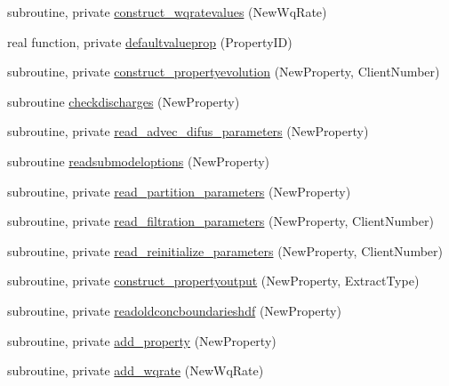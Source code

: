 \begin{DoxyCompactItemize}
\item 
subroutine, private \mbox{\hyperlink{namespacemodulewaterproperties_ad23f7574f0a024c14e1ef11aeadb52ab}{construct\+\_\+wqratevalues}} (New\+Wq\+Rate)
\item 
real function, private \mbox{\hyperlink{namespacemodulewaterproperties_a3a9b963326300338acf15af3b6edcdae}{defaultvalueprop}} (Property\+ID)
\item 
subroutine, private \mbox{\hyperlink{namespacemodulewaterproperties_ac9ab6b0f5ee3c2470edaceaf1ef669a7}{construct\+\_\+propertyevolution}} (New\+Property, Client\+Number)
\item 
subroutine \mbox{\hyperlink{namespacemodulewaterproperties_a3d45e3e4c8782ebce340659d7f000fbb}{checkdischarges}} (New\+Property)
\item 
subroutine, private \mbox{\hyperlink{namespacemodulewaterproperties_a178c0df0a5c46c1d129d7dfd6e6982fc}{read\+\_\+advec\+\_\+difus\+\_\+parameters}} (New\+Property)
\item 
subroutine \mbox{\hyperlink{namespacemodulewaterproperties_a5a214d6f2f108bf67d3db3df4165609d}{readsubmodeloptions}} (New\+Property)
\item 
subroutine, private \mbox{\hyperlink{namespacemodulewaterproperties_ac511e23eb2975f0a46fef2973712f060}{read\+\_\+partition\+\_\+parameters}} (New\+Property)
\item 
subroutine, private \mbox{\hyperlink{namespacemodulewaterproperties_ace6684fcd5340a736f01034eee0565cd}{read\+\_\+filtration\+\_\+parameters}} (New\+Property, Client\+Number)
\item 
subroutine, private \mbox{\hyperlink{namespacemodulewaterproperties_adb847af3f3968c2d9bf627677cb37d95}{read\+\_\+reinitialize\+\_\+parameters}} (New\+Property, Client\+Number)
\item 
subroutine, private \mbox{\hyperlink{namespacemodulewaterproperties_a37e8798b8bd2e4c33eff80dd151d0d31}{construct\+\_\+propertyoutput}} (New\+Property, Extract\+Type)
\item 
subroutine, private \mbox{\hyperlink{namespacemodulewaterproperties_ab37c7ef1af4bcefaf38220a0ce3fdf12}{readoldconcboundarieshdf}} (New\+Property)
\item 
subroutine, private \mbox{\hyperlink{namespacemodulewaterproperties_ac86532460470d9c3746a9645ede24903}{add\+\_\+property}} (New\+Property)
\item 
subroutine, private \mbox{\hyperlink{namespacemodulewaterproperties_ab70fa49456211c5f7697e02f7d5e81d2}{add\+\_\+wqrate}} (New\+Wq\+Rate)
\item 

\end{DoxyCompactItemize}
